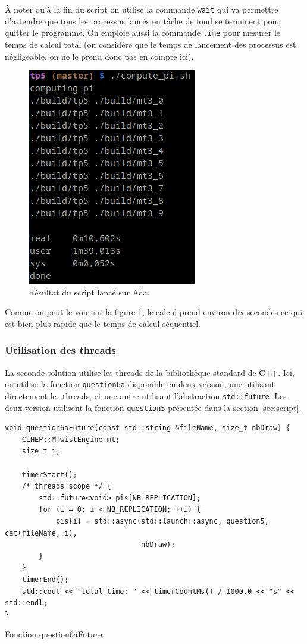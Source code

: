 \documentclass[a4paper]{article}
\begin{document}
À noter qu'à la fin du script on utilise la commande \lstinline{wait} qui va
permettre d'attendre que tous les processus lancés en tâche de fond se terminent
pour quitter le programme. On emploie aussi la commande \lstinline{time} pour
mesurer le temps de calcul total (on considère que le temps de lancement des
processus est négligeable, on ne le prend donc pas en compte ici).\\

\begin{figure}[ht!]
  \centering
  \includegraphics[scale=0.5]{./img/pi_script.png}
  \caption{Résultat du script lancé sur Ada.}
  \label{fig:script}
\end{figure}

Comme on peut le voir sur la figure \ref{fig:script}, le calcul prend environ
dix secondes ce qui est bien plus rapide que le temps de calcul séquentiel.

\subsubsection{Utilisation des threads}

La seconde solution utilise les threads de la bibliothèque standard de C++. Ici,
on utilise la fonction \lstinline{question6a} disponible en deux version, une
utilisant directement les threads, et une autre utilisant l'abstraction
\lstinline{std::future}. Les deux version utilisent la fonction
\lstinline{question5} présentée dans la section \ref{sec:script}.

\begin{listing}[ht!]
\begin{verbatim}
void question6aFuture(const std::string &fileName, size_t nbDraw) {
    CLHEP::MTwistEngine mt;
    size_t i;

    timerStart();
    /* threads scope */ {
        std::future<void> pis[NB_REPLICATION];
        for (i = 0; i < NB_REPLICATION; ++i) {
            pis[i] = std::async(std::launch::async, question5, cat(fileName, i),
                                nbDraw);
        }
    }
    timerEnd();
    std::cout << "total time: " << timerCountMs() / 1000.0 << "s" << std::endl;
}
\end{verbatim}
\caption{Fonction question6aFuture.}
\label{fn-q6}
\end{listing}
\end{document}

